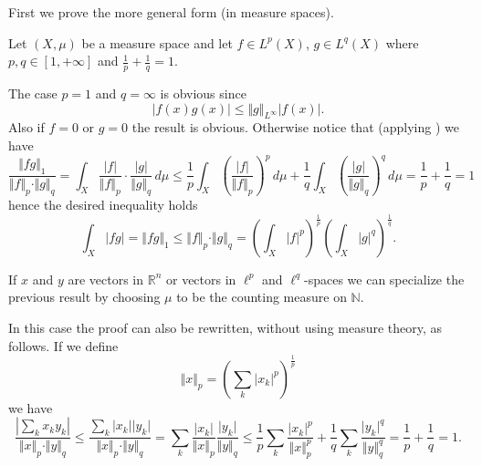 \documentclass[12pt]{article}
\begin{document}
First we prove the more general form (in measure spaces).

Let $(X,\mu)$ be a measure space and let $f\in L^p(X)$, $g\in L^q(X)$ where $p,q\in [1,+\infty]$ and $\frac 1 p + \frac 1 q = 1$.

The case $p=1$ and $q=\infty$ is obvious since
\[
  \vert f(x) g(x)\vert \le \Vert g\Vert_{L^\infty} \vert f(x)\vert.
\]
Also if $f=0$ or $g=0$ the result is obvious. 
Otherwise notice that (applying ) we have
\[
\frac{\Vert fg\Vert_1}{\Vert f\Vert_p\cdot \Vert g\Vert_q}
= \int_X \frac{\vert f\vert}{\Vert f\Vert_p} \cdot
  \frac{\vert g\vert}{\Vert g\Vert_q} \, d\mu
\le \frac 1 p \int_X \left(\frac{\vert f\vert}{\Vert f\Vert_p}\right)^p\, d\mu
 + \frac 1 q \int_X \left(\frac{\vert g\vert}{\Vert g\Vert_q}\right)^q\, d\mu
= \frac 1 p + \frac 1 q = 1
\]
hence the desired inequality holds
\[
  \int_X \vert f g\vert = \Vert fg\Vert_1 \le \Vert f \Vert_p \cdot
   \Vert g\Vert_q = \left(\int_X \vert f\vert^p\right)^{\frac 1 p}
   \left(\int_X \vert g\vert ^q\right)^{\frac 1 q}.
\]

If $x$ and $y$ are vectors in ${\mathbb R}^n$ or vectors in $\ell^p$ and $\ell^q$-spaces we can specialize the previous result by choosing $\mu$ to be the counting measure on ${\mathbb N}$.  

In this case the proof can also be rewritten, without using measure theory,
as follows.
If we define
\[
  \Vert x \Vert_p = \left(\sum_k \vert x_k\vert^p\right)^{\frac 1 p}
\]
we have
\[
 \frac{\left\vert \sum_k x_k y_k \right\vert}{\Vert x\Vert_p \cdot \Vert y \Vert_q}
\le \frac{\sum_k \vert x_k\vert \vert y_k\vert}{\Vert x\Vert_p\cdot \Vert y\Vert_q}
= \sum_k \frac{\vert x_k\vert}{\Vert x\Vert_p} \frac{\vert y_k\vert}{\Vert y\Vert_q}
\le \frac 1 p \sum_k \frac{\vert x_k\vert^p}{\Vert x\Vert_p^p} +
 \frac 1 q \sum_k \frac{\vert y_k\vert^q}{\Vert y\Vert_q^q}
= \frac 1 p + \frac 1 q = 1.
\]
\end{document}

